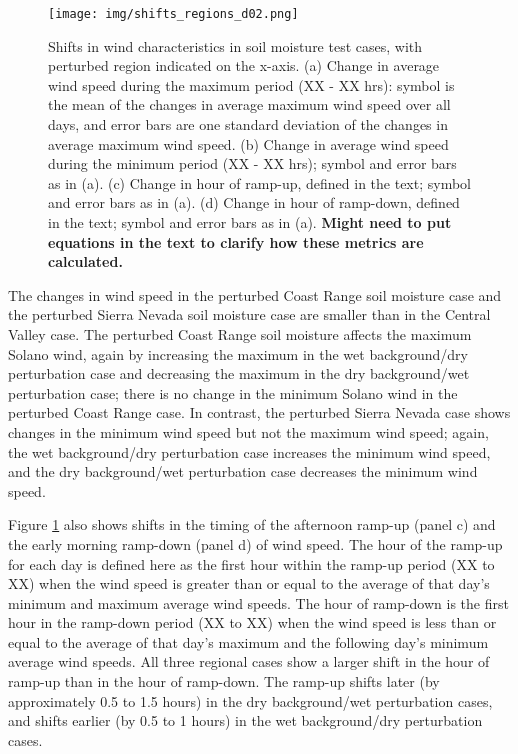 \begin{figure}[here]
\texttt{[image: img/shifts\_regions\_d02.png]}
\caption{Shifts in wind characteristics in soil moisture test cases, with perturbed region indicated on the x-axis.  (a) Change in average wind speed during the maximum period (XX - XX hrs): symbol is the mean of the changes in average maximum wind speed over all days, and error bars are one standard deviation of the changes in average maximum wind speed.  (b) Change in average wind speed during the minimum period (XX - XX hrs); symbol and error bars as in (a).  (c) Change in hour of ramp-up, defined in the text; symbol and error bars as in (a).  (d) Change in hour of ramp-down, defined in the text; symbol and error bars as in (a).  \textbf{Might need to put equations in the text to clarify how these metrics are calculated.}}
\label{fig:windSol_WindShiftsRg}
\end{figure}

The changes in wind speed in the perturbed Coast Range soil moisture case and the perturbed Sierra Nevada soil moisture case are smaller than in the Central Valley case.  The perturbed Coast Range soil moisture affects the maximum Solano wind, again by increasing the maximum in the wet background/dry perturbation case and decreasing the maximum in the dry background/wet perturbation case; there is no change in the minimum Solano wind in the perturbed Coast Range case.  In contrast, the perturbed Sierra Nevada case shows changes in the minimum wind speed but not the maximum wind speed; again, the wet background/dry perturbation case increases the minimum wind speed, and the dry background/wet perturbation case decreases the minimum wind speed.

Figure \ref{fig:windSol_WindShiftsRg} also shows shifts in the timing of the afternoon ramp-up (panel c) and the early morning ramp-down (panel d) of wind speed.  The hour of the ramp-up for each day is defined here as the first hour within the ramp-up period (XX to XX) when the wind speed is greater than or equal to the average of that day's minimum and maximum average wind speeds.  The hour of ramp-down is the first hour in the ramp-down period (XX to XX) when the wind speed is less than or equal to the average of that day's maximum and the following day's minimum average wind speeds.  All three regional cases show a larger shift in the hour of ramp-up than in the hour of ramp-down.  The ramp-up shifts later (by approximately 0.5 to 1.5 hours) in the dry background/wet perturbation cases, and shifts earlier (by 0.5 to 1 hours) in the wet background/dry perturbation cases.

